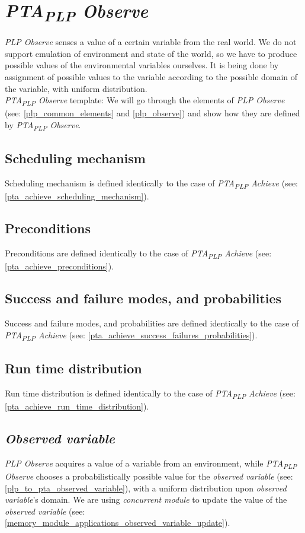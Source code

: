 \section{\textit{PTA\textsubscript{PLP} Observe}}
\textit{PLP Observe} senses a value of a certain variable from the real world. We do not support emulation of environment and state of the world, so we have to produce possible values of the environmental variables ourselves. It is being done by assignment of possible values to the variable according to the possible domain of the variable, with uniform distribution. \\
\textit{PTA\textsubscript{PLP} Observe} template:   We will go through the elements of \textit{PLP Observe} (see: \ref{plp_common_elements} and \ref{plp_observe}) and show how they are defined by \textit{PTA\textsubscript{PLP} Observe}.\\
\subsection{Scheduling mechanism}
Scheduling mechanism is defined identically to the case of \textit{PTA\textsubscript{PLP} Achieve}  (see: \ref{pta_achieve_scheduling_mechanism}).\\
\subsection{Preconditions}
Preconditions are defined identically to the case of \textit{PTA\textsubscript{PLP} Achieve}  (see: \ref{pta_achieve_preconditions}).\\
\subsection{Success and failure modes, and probabilities }
Success and failure modes, and probabilities are defined identically to the case of \textit{PTA\textsubscript{PLP} Achieve}  (see: \ref{pta_achieve_success_failures_probabilities}).\\
\subsection{Run time distribution}
Run time distribution is defined identically to the case of \textit{PTA\textsubscript{PLP} Achieve}  (see: \ref{pta_achieve_run_time_distribution}).\\
\subsection{\textit{Observed variable} }
\textit{PLP Observe} acquires a value of a variable from an environment, while \textit{PTA\textsubscript{PLP} Observe} chooses a probabilistically possible value for the \textit{observed variable} (see: \ref{plp_to_pta_observed_variable}), with a uniform distribution upon \textit{observed variable}’s domain. We are using \textit{concurrent module} to update the value of the \textit{observed variable} (see: \ref{memory_module_applications_observed_variable_update}).\\
